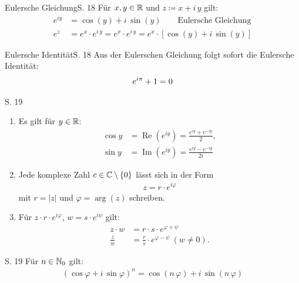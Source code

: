 \begin{bemerkung}{Eulersche Gleichung}{S. 18}
  Für $x, y \in \mathbb{R}$ und $z \coloneqq x + i\,y$ gilt:
  \begin{align}
    e^{iy} &= \cos(y) + i \, \sin(y) \qquad \text{Eulersche Gleichung}\\
    e^z &= e^x \cdot e^{i \, y} = e^x \cdot e^{i \, y} = e^x \cdot \left[ \cos(y) + i \, \sin(y) \right]
  \end{align}
\end{bemerkung}

\begin{bemerkung}{Eulersche Identität}{S. 18}
  Aus der Eulerschen Gleichung folgt sofort die Eulersche Identität:
  {
    \Huge
    \begin{align}
      e^{i\pi} + 1 = 0 \notag
    \end{align}
  }
\end{bemerkung}

\begin{satz}{S. 19}
  \label{satz:1_4}
  \begin{enumerate}
    \item Es gilt für $y \in \mathbb{R}$:
      \begin{align}
        \cos y &= \operatorname{Re}\left( e^{iy} \right) = \frac{e^{iy} + e^{-iy}}{2},\\
        \sin y &= \operatorname{Im}\left( e^{iy} \right) = \frac{e^{iy} - e^{-iy}}{2i}
      \end{align}
    \item Jede komplexe Zahl $c \in \mathbb{C}\setminus\{0\}$ lässt sich in der Form
      \begin{align}
        z = r \cdot e^{i\varphi}
      \end{align}
      mit $r = |z|$ und $\varphi = \operatorname{arg}(z)$ schreiben.
    \item Für $z \cdot r \cdot e^{i\varphi}$, $w = s \cdot e^{i\psi}$ gilt:
      \begin{align}
        z \cdot w &= r \cdot s \cdot e^{\varphi + \psi}\\
        \frac{z}{w} &= \frac{r}{s} \cdot e^{\varphi - \psi} \ (w \neq 0).
      \end{align}
  \end{enumerate}
\end{satz}

\begin{satz}{S. 19}
  \label{satz:1_5}
  Für $n \in \mathbb{N}_0$ gilt:
  \begin{align}
    \left( \cos \varphi + i \, \sin \varphi \right)^n = \cos \left( n \, \varphi \right) + i \, \sin \left( n \, \varphi \right)
  \end{align}
\end{satz}



